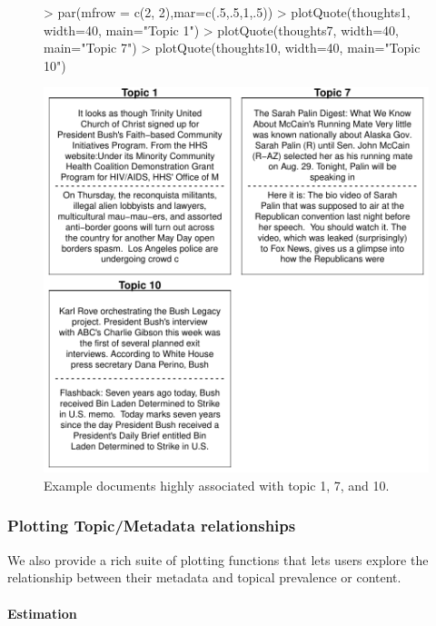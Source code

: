 \documentclass[nojss]{jss}
\begin{document}
\begin{figure}[t!]
\begin{center}
\begin{Schunk}
\begin{Sinput}
> par(mfrow = c(2, 2),mar=c(.5,.5,1,.5))
> plotQuote(thoughts1, width=40, main="Topic 1")
> plotQuote(thoughts7, width=40, main="Topic 7")
> plotQuote(thoughts10, width=40, main="Topic 10")
\end{Sinput}
\end{Schunk}
\includegraphics{stmVignette-013}
\caption{Example documents highly associated with topic 1, 7, and 10.}
\label{fig:example}
\end{center}
\end{figure}



\subsubsection{Plotting Topic/Metadata relationships}
We also provide a rich suite of plotting functions that lets users explore the relationship between their metadata and topical prevalence or content.

\paragraph{Estimation}
\end{document}
